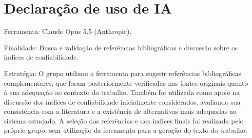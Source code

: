 \documentclass[10pt, twocolumn, a4paper]{article}
\begin{document}
\section{Declaração de uso de IA}

Ferramenta: Claude Opus 5.5 (Anthropic).

Finalidade: Busca e validação de referências bibliográficas e discussão sobre os índices de confiabilidade.

Estratégia: O grupo utilizou a ferramenta para sugerir referências bibliográficas complementares, que foram posteriormente verificadas nas fontes originais quanto à sua adequação ao contexto do trabalho. Também foi utilizada como apoio na discussão dos índices de confiabilidade inicialmente considerados, avaliando sua consistência com a literatura e a existência de alternativas mais adequadas ao sistema estudado. A seleção das referências e dos índices finais foi realizada pelo próprio grupo, sem utilização da ferramenta para a geração do texto do trabalho.


\end{document}
